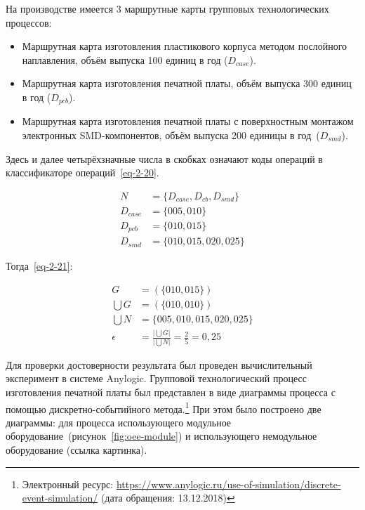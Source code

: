 На производстве имеется 3 маршрутные карты групповых технологических процессов:

\begin{itemize}
	\item Маршрутная карта изготовления пластикового корпуса методом послойного наплавления, объём выпуска 100 единиц в год ($D_{case}$).
	\item Маршрутная карта изготовления печатной платы, объём выпуска 300 единиц в год ($D_{pcb}$).
	\item Маршрутная карта изготовления печатной платы с поверхностным монтажом электронных SMD-компонентов, объём выпуска 200 единицы в год~($D_{smd}$).
\end{itemize}

Здесь и далее четырёхзначные числа в скобках означают коды операций в классификаторе операций~\cref{eq-2-20}.


\begin{equation}
\begin{split}
	N &= \{D_{case}, D_{cb}, D_{smd}\} \\
	D_{case} &= \{005, 010\} \\
	D_{pcb} &= \{010, 015\} \\
	D_{smd} &= \{010, 015, 020, 025\}
\end{split}
\label{eq-2-20}
\end{equation}

\noindent Тогда~\cref{eq-2-21}:

\begin{equation}
\begin{split}
G &= (\{010, 015\}) \\
\bigcup G &= (\{010, 010\}) \\
\bigcup N &= \{005, 010, 015, 020, 025\} \\
\epsilon &= \frac{\big|\bigcup G \big|}{\big|\bigcup N \big|} = \frac{2}{5} = 0,25
\end{split}
\label{eq-2-21}
\end{equation}

Для проверки достоверности результата был проведен вычислительный эксперимент в системе Anylogic. Групповой технологический процесс изготовления печатной платы был представлен в виде диаграммы процесса с помощью дискретно-событийного метода.\footnote{Электронный ресурс: \url{https://www.anylogic.ru/use-of-simulation/discrete-event-simulation/} (дата обращения: 13.12.2018)} При этом было построено две диаграммы: для процесса использующего модульное оборудование~(рисунок~\cref{fig:oee-module}) и использующего немодульное оборудование (ссылка картинка).

